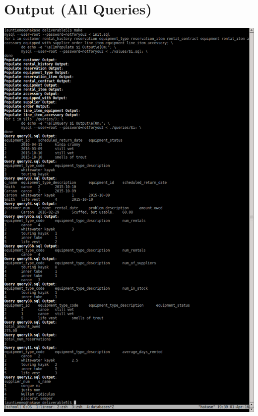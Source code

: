\documentclass[12pt]{article}
\begin{document}
\section{Output (All Queries)}
\includegraphics[scale=0.45]{./screenshots/deliverable5output.png}
\end{document}
